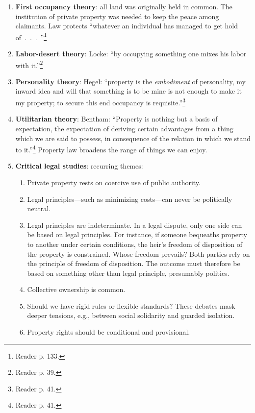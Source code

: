 \begin{enumerate}
    \item \textbf{First occupancy theory}: all land was originally held in 
    common. The institution of private property was needed to keep the peace 
    among claimants. Law protects ``whatever an individual has managed to get 
    hold of~.~.~.~''\footnote{Reader p. 133.}
    \item \textbf{Labor-desert theory}: Locke: ``by occupying something one 
    mixes his labor with it.''\footnote{Reader p. 39.}
    \item \textbf{Personality theory}: Hegel: ``property is the 
    \emph{embodiment} of personality, my inward idea and will that something 
    is to be mine is not enough to make it my property; to secure this end 
    occupancy is requisite.''\footnote{Reader p. 41.}
    \item \textbf{Utilitarian theory}: Bentham: ``Property is nothing but a 
    basis of expectation, the expectation of deriving certain advantages from 
    a thing which we are said to possess, in consequence of the relation in 
    which we stand to it.''\footnote{Reader p. 41.} Property law broadens the 
    range of things we can enjoy.
    \item \textbf{Critical legal studies}: recurring themes:
    \begin{enumerate}
        \item Private property rests on coercive use of public authority.
        \item Legal principles---such as minimizing costs---can never be 
        politically neutral.
        \item Legal principles are indeterminate. In a legal dispute, only one 
        side can be based on legal principles. For instance, if someone 
        bequeaths property to another under certain conditions, the heir's 
        freedom of disposition of the property is constrained. Whose freedom 
        prevails? Both parties rely on the principle of freedom of 
        disposition. The outcome must therefore be based on something other 
        than legal principle, presumably politics.
        \item Collective ownership is common.
        \item Should we have rigid rules or flexible standards? These debates 
        mask deeper tensions, e.g., between social solidarity and guarded 
        isolation.
        \item Property rights should be conditional and provisional.
    \end{enumerate}
\end{enumerate}
